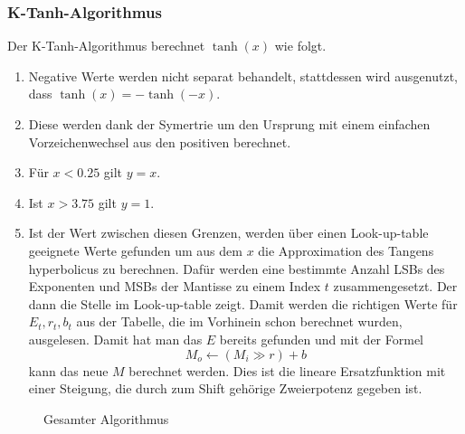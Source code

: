 \subsubsection{K-Tanh-Algorithmus
\label{transfer:subsection:Ktanh-Algorithmus}}
Der K-Tanh-Algorithmus berechnet $\tanh(x)$ wie folgt.
\begin{enumerate}
\item
Negative Werte werden nicht separat behandelt, stattdessen wird 
ausgenutzt, dass $\tanh(x)=-\tanh(-x)$.
\item
Diese werden dank der Symertrie um den Ursprung mit einem einfachen
Vorzeichenwechsel aus den positiven berechnet.
\item
Für $x < 0.25$ gilt $y = x$.
\item
Ist $x > 3.75$ gilt $y = 1$.
\item
Ist der Wert zwischen diesen Grenzen, werden über einen Look-up-table geeignete Werte gefunden um aus dem $x$ die Approximation des Tangens hyperbolicus zu berechnen.
Dafür werden eine bestimmte Anzahl LSBs des Exponenten und MSBs der Mantisse zu einem Index $t$ zusammengesetzt.
Der dann die Stelle im Look-up-table zeigt.
Damit werden die richtigen Werte für $E_{t}, r_{t}, b_{t}$ aus der Tabelle, die im Vorhinein schon berechnet wurden, ausgelesen.
Damit hat man das $E$ bereits gefunden und mit der Formel
\[
M_{o} \leftarrow\left(M_{i} \gg r\right)+b
\]
kann das neue $M$ berechnet werden.
Dies ist die lineare Ersatzfunktion mit einer Steigung, die durch
zum Shift gehörige Zweierpotenz gegeben ist.
\end{enumerate}

\begin{figure}
\centering
{}
\caption{Gesamter Algorithmus
\label{motivation:figure:gesalgo}}
\end{figure}


